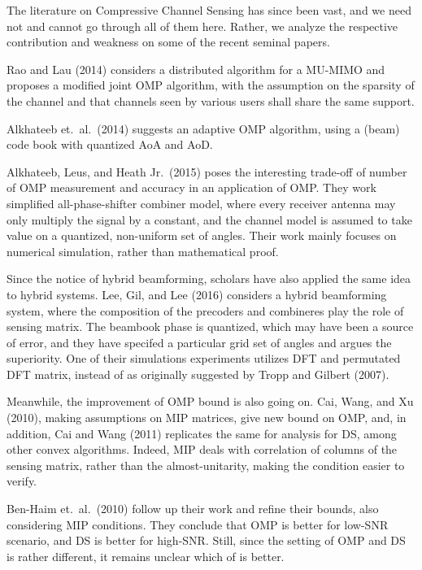 \stopsection
\startsection [title={Further Development on Compressive Channel Sensing}]

The literature on Compressive Channel Sensing has since been vast, and we need not and cannot go through all of them here.
Rather, we analyze the respective contribution and weakness on some of the recent seminal papers.

Rao and Lau (2014) considers a distributed algorithm for a MU-MIMO and proposes a modified joint OMP algorithm, with the assumption on the sparsity of the channel and that channels seen by various users shall share the same support.

Alkhateeb et.\ al.\ (2014) suggests an adaptive OMP algorithm, using a (beam) code book with quantized AoA and AoD.

Alkhateeb, Leus, and Heath Jr.\ (2015) poses the interesting trade-off of number of OMP measurement and accuracy in an application of OMP.
They work simplified all-phase-shifter combiner model, where every receiver antenna may only multiply the signal by a constant, and the channel model is assumed to take value on a quantized, non-uniform set of angles.
Their work mainly focuses on numerical simulation, rather than mathematical proof.

Since the notice of hybrid beamforming, scholars have also applied the same idea to hybrid systems.
Lee, Gil, and Lee (2016) considers a hybrid beamforming system, where the composition of the precoders and combineres play the role of sensing matrix.
The beambook phase is quantized, which may have been a source of error, and they have specifed a particular grid set of angles and argues the superiority.
One of their simulations experiments utilizes DFT and permutated DFT matrix, instead of as originally suggested by Tropp and Gilbert (2007).

Meanwhile, the improvement of OMP bound is also going on.
Cai, Wang, and Xu (2010), making assumptions on MIP matrices, give new bound on OMP, and, in addition, Cai and Wang (2011) replicates the same for analysis for DS, among other convex algorithms.
Indeed, MIP deals with correlation of columns of the sensing matrix, rather than the almost-unitarity, making the condition easier to verify.

Ben-Haim et.\ al.\ (2010) follow up their work and refine their bounds, also considering MIP conditions.
They conclude that OMP is better for low-SNR scenario, and DS is better for high-SNR.
Still, since the setting of OMP and DS is rather different, it remains unclear which of is better.

